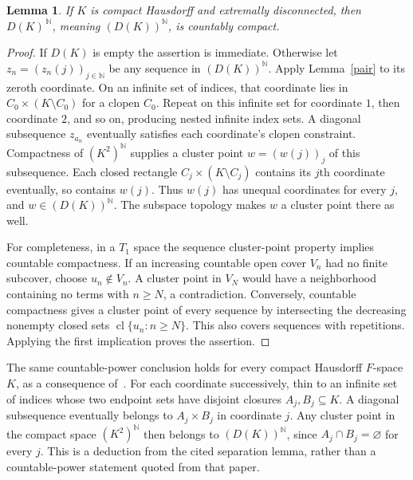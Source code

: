 \documentclass[11pt]{article}
\newtheorem{lemma}[theorem]{Lemma}
\newcommand{\N}{\mathbb N}
\newcommand{\DS}[1]{D(#1)}
\newcommand{\cl}{\operatorname{cl}}
\begin{document}
\begin{lemma}\label{power}
If $K$ is compact Hausdorff and extremally disconnected, then
$\DS K^{\,\N}$, meaning $(\DS K)^\N$, is countably compact.
\end{lemma}
\begin{proof}
If $\DS K$ is empty the assertion is immediate. Otherwise let
$z_n=(z_n(j))_{j\in\N}$ be any sequence in $(\DS K)^\N$.
Apply Lemma~\ref{pair} to its zeroth coordinate. On an infinite
set of indices, that coordinate lies in $C_0\times(K\setminus C_0)$
for a clopen $C_0$. Repeat on this infinite set for coordinate $1$,
then coordinate $2$, and so on, producing nested infinite index sets.
A diagonal subsequence $z_{a_n}$ eventually satisfies each coordinate's
clopen constraint. Compactness of $(K^2)^\N$ supplies a cluster point
$w=(w(j))_j$ of this subsequence. Each closed rectangle
$C_j\times(K\setminus C_j)$ contains its $j$th coordinate eventually,
so contains $w(j)$. Thus $w(j)$ has unequal coordinates for every $j$,
and $w\in(\DS K)^\N$. The subspace topology makes $w$ a cluster
point there as well.

For completeness, in a $T_1$ space the sequence cluster-point property
implies countable compactness. If an increasing countable open cover
$V_n$ had no finite subcover, choose $u_n\notin V_n$. A cluster point
in $V_N$ would have a neighborhood containing no terms with $n\ge N$,
a contradiction. Conversely, countable compactness gives a cluster
point of every sequence by intersecting the decreasing nonempty
closed sets $\cl\{u_n:n\ge N\}$. This also covers sequences with
repetitions. Applying the first implication proves the assertion.
\end{proof}

The same countable-power conclusion holds for every compact Hausdorff
$F$-space $K$, as a consequence of~\cite[Lemma~2.1]{PPS}.
For each coordinate successively, thin to an infinite set of indices
whose two endpoint sets have disjoint closures $A_j,B_j\subseteq K$.
A diagonal subsequence eventually belongs to $A_j\times B_j$ in
coordinate $j$. Any cluster point in the compact space $(K^2)^\N$
then belongs to $(D(K))^\N$, since $A_j\cap B_j=\varnothing$ for every
$j$. This is a deduction from the cited separation lemma, rather than
a countable-power statement quoted from that paper.
\end{document}
